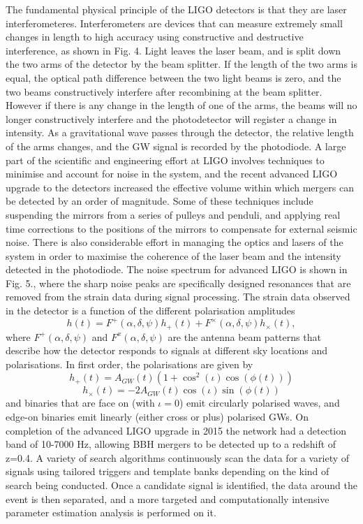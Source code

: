 \documentclass[11pt]{article}
\begin{document}
The fundamental physical principle of the LIGO detectors is that they are laser interferometeres. Interferometers are devices that can measure extremely small changes in length to high accuracy using constructive and destructive interference, as shown in Fig. 4. Light leaves the laser beam, and is split down the two arms of the detector by the beam splitter. If the length of the two arms is equal, the optical path difference between the two light beams is zero, and the two beams constructively interfere after recombining at the beam splitter. However if there is any change in the length of one of the arms, the beams will no longer constructively interfere and the photodetector will register a change in intensity. As a gravitational wave passes through the detector, the relative length of the arms changes, and the GW signal is recorded by the photodiode. A large part of the scientific and engineering effort at LIGO involves techniques to minimise and account for noise in the system, and the recent advanced LIGO upgrade to the detectors increased the effective volume within which mergers can be detected by an order of magnitude\cite{noise}\cite{noise2}. Some of these techniques include suspending the mirrors from a series of pulleys and penduli, and applying real time corrections to the positions of the mirrors to compensate for external seismic noise. There is also considerable effort in managing the optics and lasers of the system in order to maximise the coherence of the laser beam and the intensity detected in the photodiode\cite{lasers}. The noise spectrum for advanced LIGO is shown in Fig. 5.\cite{noise3}, where the sharp noise peaks are specifically designed resonances that are removed from the strain data during signal processing. The strain data observed in the detector is a function of the different polarisation amplitudes
\begin{equation}
h(t)=F^{+}(\alpha,\delta,\psi)h_+(t)+F^{\times}(\alpha,\delta,\psi)h_\times(t),
\end{equation}
where $F^{+}(\alpha,\delta,\psi)$ and $F^{x}(\alpha,\delta,\psi)$ are the antenna beam patterns that describe how the detector responds to signals at different sky locations and polarisations\cite{beampat}. In first order, the polarisations are given by
\begin{equation}
h_+(t)=A_{GW}(t)(1+\cos^2(\iota)\cos(\phi(t)))
\end{equation}
\begin{equation}
h_\times(t)=-2A_{GW}(t)\cos(\iota)\sin(\phi(t))
\end{equation}
and binaries that are face on (with $\iota=0$) emit circularly polarised waves, and edge-on binaries emit linearly (either cross or plus) polarised GWs. On completion of the advanced LIGO upgrade in 2015 the network had a detection band of 10-7000 Hz, allowing BBH mergers to be detected up to a redshift of z=0.4\cite{lasers}. A variety of search algorithms continuously scan the data for a variety of signals\cite{search1}\cite{search2} using tailored triggers and template banks depending on the kind of search being conducted. Once a candidate signal is identified, the data around the event is then separated, and a more targeted and computationally intensive parameter estimation analysis is performed on it.
\end{document}
